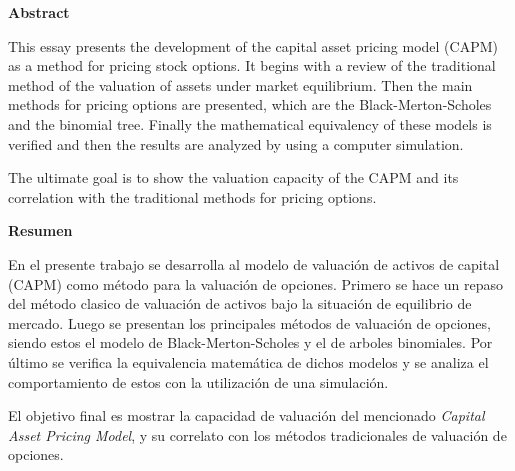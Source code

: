 
\begin{center}
	\bf Abstract
\end{center}

This essay presents the development of the capital asset pricing model (CAPM) as a method for pricing stock options. It begins with a review of the traditional method of the valuation of assets under market equilibrium.  Then the main methods for pricing options are presented, which are the Black-Merton-Scholes and the binomial tree. Finally the mathematical equivalency of these models is verified and then the results are analyzed by using a computer simulation.

The ultimate goal is to show the valuation capacity of the CAPM and its correlation with the traditional methods for pricing options.

\vspace{1.5cm}
\begin{center}
	\bf Resumen
\end{center}

En el presente trabajo se desarrolla al modelo de valuación de activos de capital (CAPM) como método para la valuación de opciones. Primero se hace un repaso del método clasico de valuación de activos bajo la situación de equilibrio de mercado. Luego se presentan los principales métodos de valuación de opciones, siendo estos el modelo de Black-Merton-Scholes y el de arboles binomiales. Por último se verifica la equivalencia matemática de dichos modelos y se analiza el comportamiento de estos con la utilización de una simulación.

El objetivo final es mostrar la capacidad de valuación del mencionado \textit{Capital Asset Pricing Model}, y su correlato con los métodos tradicionales de valuación de opciones.

\thispagestyle{empty}
